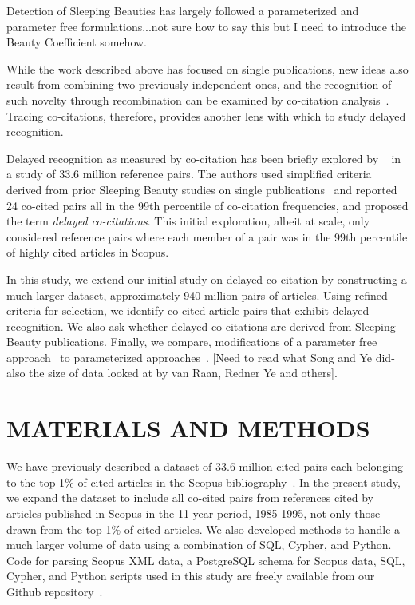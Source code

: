 \documentclass[utf8]{frontiersSCNS}
\begin{document}
Detection of Sleeping Beauties has largely followed a parameterized and parameter free formulations...not sure how to say this but I need to introduce the Beauty Coefficient somehow.


While the work described above has focused on single publications, new ideas also result from combining two previously independent ones, and the recognition of such novelty through recombination can be examined by co-citation analysis~\citep{MarshakovaShaikevich1973,Small1973,Uzzi2013,Boyack2014,Wang2017,Bradley2020}. Tracing co-citations, therefore, provides another lens with which to study delayed recognition. 

Delayed recognition as measured by co-citation has been briefly explored by ~\cite{devarakonda_2020} in a study of 33.6 million reference pairs. The authors used simplified criteria derived from prior Sleeping Beauty studies on single publications~\citep{Ke2015,Raan2004,Raan2019} and reported 24 co-cited pairs all in the 99th percentile of co-citation frequencies, and proposed the term \emph{delayed co-citations}.  This initial exploration, albeit at scale, only considered reference pairs where each member of a pair was in the 99th percentile of highly cited articles in Scopus.

In this study, we extend our initial study on delayed co-citation by constructing a much larger dataset, approximately 940 million pairs of articles. Using refined criteria for selection, we identify co-cited article pairs that exhibit delayed recognition. We also ask whether delayed co-citations are derived from Sleeping Beauty publications. Finally, we compare, modifications of a parameter free approach~\citep{Ke2015} to parameterized approaches~\citep{Raan2004,Raan2019}. [Need to read what Song and Ye did- also the size of data looked at by van Raan, Redner Ye and others].


\section{MATERIALS AND METHODS}

We have previously described a dataset of 33.6 million cited pairs each belonging to the top 1\% of cited articles in the Scopus bibliography~\citep[Figure~2]{devarakonda_2020}. In the present study, we expand the dataset to include all co-cited pairs from references cited by articles published in Scopus in the 11 year period, 1985-1995, not only those drawn from the top 1\% of cited articles. We also developed methods to handle a much larger volume of data using a combination of SQL, Cypher, and Python. Code for parsing Scopus XML data, a PostgreSQL schema for Scopus data, SQL, Cypher, and Python scripts used in this study are freely available from our Github repository~\citep{Korobskiy2019}.
\end{document}
